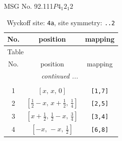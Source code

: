 \documentclass[fleqn,8pt]{jsarticle}
\begin{document}
\setcounter{MaxMatrixCols}{32}

\renewcommand{\tablename}{Table~}
\renewcommand{\figurename}{Figure~}
\begin{center}
\LARGE
MSG No. 92.111\quad$P4_{1}2_{1}2$
\end{center}
\renewcommand{\arraystretch}{1.2}
\begin{longtable}{ccc}
\caption{Wyckoff site: {\tt 4a}, site symmetry: {\tt ..2}}
 \\
 \hline \hline
No. & position & mapping \\ \hline \endfirsthead

\multicolumn{2}{l}{\tablename\ \thetable{}} \\
 \hline \hline
No. & position & mapping \\ \hline \endhead

 \hline \hline
\multicolumn{2}{r}{\footnotesize\it continued ...} \\ \endfoot

 \hline \hline
\multicolumn{2}{r}{} \\ \endlastfoot

1 & $\left[ x,\, x,\, 0 \right]$ & {\tt [1,7]} \\ \hline
2 & $\left[ \frac{1}{2} - x,\, x + \frac{1}{2},\, \frac{1}{4} \right]$ & {\tt [2,5]} \\ \hline
3 & $\left[ x + \frac{1}{2},\, \frac{1}{2} - x,\, \frac{3}{4} \right]$ & {\tt [3,4]} \\ \hline
4 & $\left[ - x,\, - x,\, \frac{1}{2} \right]$ & {\tt [6,8]} \\
\end{longtable}
\renewcommand{\arraystretch}{1.2}
\end{document}
